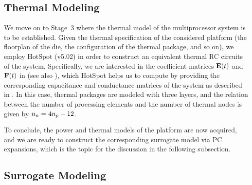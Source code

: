 \subsection{Thermal Modeling}

We move on to Stage~3 where the thermal model of the multiprocessor system is to
be established. Given the thermal specification \spec of the considered platform
(the floorplan of the die, the configuration of the thermal package, and so on),
we employ HotSpot (v5.02) \cite{skadron2004} in order to construct an equivalent
thermal RC circuits of the system. Specifically, we are interested in the
coefficient matrices $\mathbf{E}(t)$ and $\mathbf{F}(t)$ in  (see also
), which HotSpot helps us to compute by providing the
corresponding capacitance and conductance matrices of the system as described in
. In this case, thermal packages are modeled with three
layers, and the relation between the number of processing elements and the
number of thermal nodes is given by ${n_{n}} = 4 {n_{p}} + 12$.

To conclude, the power and thermal models of the platform are now acquired, and
we are ready to construct the corresponding surrogate model via PC expansions,
which is the topic for the discussion in the following subsection.

\subsection{Surrogate Modeling}

